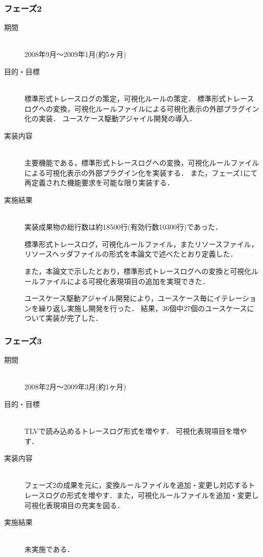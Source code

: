 \subsubsection{フェーズ2}

\begin{description}
\item[期間] \mbox{} \\
2008年9月～2009年1月(約5ヶ月)

\item[目的・目標] \mbox{} \\
標準形式トレースログの策定，可視化ルールの策定．
標準形式トレースログへの変換，可視化ルールファイルによる可視化表示の外部プラグイン化の実装．
ユースケース駆動アジャイル開発の導入．

\item[実装内容] \mbox{} \\
主要機能である，標準形式トレースログへの変換，可視化ルールファイルによる可視化表示の外部プラグイン化を実装する．
また，フェーズ1にて再定義された機能要求を可能な限り実装する．

\item[実施結果] \mbox{} \\
実装成果物の総行数は約18500行(有効行数10300行)であった．

標準形式トレースログ，可視化ルールファイル，またリソースファイル，リソースヘッダファイルの形式を本論文で述べたとおり定義した．

また，本論文で示したとおり，標準形式トレースログへの変換と可視化ルールファイルによる可視化表現項目の追加を実現できた．

ユースケース駆動アジャイル開発により，ユースケース毎にイテレーションを繰り返し実施し開発を行った．
結果，36個中27個のユースケースについて実装が完了した．



\end{description}




\subsubsection{フェーズ3}

\begin{description}
\item[期間] \mbox{} \\
2008年2月～2009年3月(約1ヶ月)

\item[目的・目標] \mbox{} \\
TLVで読み込めるトレースログ形式を増やす．
可視化表現項目を増やす．

\item[実装内容] \mbox{} \\
フェーズ2の成果を元に，変換ルールファイルを追加・変更し対応するトレースログの形式を増やす．また，可視化ルールファイルを追加・変更し可視化表現項目の充実を図る．

\item[実施結果] \mbox{} \\
未実施である．

\end{description}


